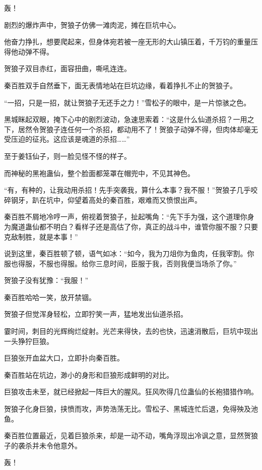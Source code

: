 
\begin{this_body}

轰！

剧烈的爆炸声中，贺狼子仿佛一滩肉泥，摊在巨坑中心。

他奋力挣扎，想要爬起来，但身体宛若被一座无形的大山镇压着，千万钧的重量压得他动弹不得。

贺狼子双目赤红，面容扭曲，嘶吼连连。

秦百胜双手自然垂下，面无表情地站在巨坑边缘，看着挣扎不止的贺狼子。

“一招，只是一招，就让贺狼子无还手之力！”雪松子的眼中，是一片惊骇之色。

黑城眯起双眼，掩下心中的剧烈波动，急速思索着：“这是什么仙道杀招？一用之下，居然令贺狼子连任何一个杀招，都动用不了！贺狼子动弹不得，但肉体却毫无受压迫的征兆。这应该是魂道的杀招……”

至于姜钰仙子，则一脸见怪不怪的样子。

而神秘的黑袍蛊仙，整个脸面都笼罩在帽兜中，不见其神色。

“有，有种的，让我动用杀招！先手突袭我，算什么本事？我不服！”贺狼子几乎咬碎钢牙，趴在坑中，仰望着高处的秦百胜，艰难而又愤恨出声。

秦百胜不屑地冷哼一声，俯视着贺狼子，扯起嘴角：“先下手为强，这个道理你身为魔道蛊仙都不明白？看样子还是高估了你，真正的战斗中，谁管你服不服？只要克敌制胜，就是本事！”

说到这里，秦百胜顿了顿，语气如冰：“如今，我为刀俎你为鱼肉，任我宰割。你服也得服，不服也得服。给你三息时间，臣服于我，否则我便当场杀了你。”

贺狼子没有犹豫：“我服！”

秦百胜哈哈一笑，放开禁锢。

贺狼子但觉浑身轻松，立即狞笑一声，猛地发出仙道杀招。

霎时间，刺目的光辉绚烂绽射。光芒来得快，去的也快，迅速消散后，巨坑中现出一头狰狞巨狼。

巨狼张开血盆大口，立即扑向秦百胜。

秦百胜站在坑边，渺小的身形和巨狼形成鲜明的对比。

巨狼攻击未至，就已经掀起一阵巨大的腥风。狂风吹得几位蛊仙的长袍猎猎作响。

贺狼子化身巨狼，挟愤而攻，声势浩荡无比。雪松子、黑城连忙后退，免得殃及池鱼。

秦百胜位置最近，见着巨狼杀来，却是一动不动，嘴角浮现出冷讽之意，显然贺狼子的袭杀并未令他意外。

轰！


\end{this_body}
